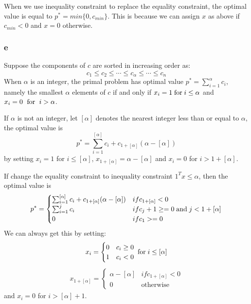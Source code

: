 \documentclass[10pt,a4paper]{article}
\begin{document}
When we use inequality constraint to replace the equality
constraint, the optimal value is equal to
$p^*=min\{0,c_{min}\}$. This is because we can assign $x$ as
above if $c_{min}<0$ and $x=0$ otherwise.

\subsubsection{e}
Suppose the components of $c$ are sorted in increasing order
as:
$$
c_1\leq c_2\leq \dotsb \leq c_{\alpha} \leq \dotsb \leq c_n
$$
When $\alpha$ is an integer, the primal problem has optimal
value $p^*=\sum_{i=1}^\alpha c_i$, namely the smallest
$\alpha$ elements of $c$ if and only if $x_i=1
\text{\;for\;} i\leq \alpha$ and $x_i=0 \text{\; for \;}
i>\alpha$.

If $\alpha$ is not an integer, let $[\alpha]$ denotes the
nearest integer less than or equal to $\alpha$, the optimal value is
$$
p^*=\sum_{i=1}^{[\alpha]}c_i+c_{1+[\alpha]}(\alpha-[\alpha])
$$
by setting $x_i=1$ for $i\leq [\alpha]$, 
$x_{1+[\alpha]}=\alpha-[\alpha]$ and $x_i=0$ for $i>1+[\alpha]$.

If change the equality constraint to inequality constraint
$1^Tx\leq \alpha$, then the optimal value is 
\begin{align*}
  p^*=
  \begin{cases}
    \sum_{i=1}^{[\alpha]}c_i+c_{1+[\alpha]}(\alpha-[\alpha]) & if c_{1+[\alpha]} <0\\
    \sum_{i=1}^j c_i & if c_j+1\geq =0 \text{\;and\;} j<1+[\alpha]\\
    0 & if c_1>=0
  \end{cases}
\end{align*}
We can always get this by setting:
\begin{align*}
  x_i=
  \begin{cases}
    0 & c_i\geq0\\
    1 & c_i<0
  \end{cases}
\text{\;for\;} i\leq [\alpha]
\end{align*}
\begin{align*}
x_{1+[\alpha]}=
  \begin{cases}
    \alpha-[\alpha] & if c_{1+[\alpha]}<0\\
    0 &\text{otherwise}
  \end{cases}
\end{align*}
 and $x_i=0$ for $i>[\alpha]+1$.
\end{document}
